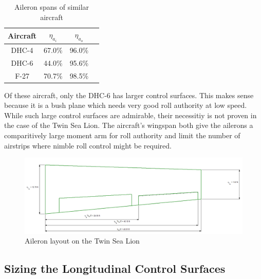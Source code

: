 \documentclass[conf]{new-aiaa}
\begin{document}
\begin{table}[H]
\centering
\caption{Aileron spans of similar aircraft}
\begin{tabular}{|c|c|c|c|}\hline
    Aircraft & $\eta_{a_i}$ & $\eta_{a_o}$ \\ \hline
    DHC-4 & 67.0\%          & 96.0\%        \\ \hline
    DHC-6 & 44.0\%          & 95.6\%        \\ \hline
    F-27  & 70.7\%          & 98.5\%        \\ \hline
\end{tabular}
\label{tab:similar_ailerons}
\end{table}

Of these aircraft, only the DHC-6 has larger control surfaces. This makes sense because it is a bush plane which needs very good roll authority at low speed. While such large control surfaces are admirable, their necessitiy is not proven in the case of the Twin Sea Lion. The aircraft's wingspan both give the ailerons a comparitively large moment arm for roll authority and limit the number of airstrips where nimble roll control might be required.


\begin{figure}[H]
    \includegraphics[width=\textwidth]{Report3Printouts/Wing_and_Aileron/aileron_sizing_plot.png}
    \caption{Aileron layout on the Twin Sea Lion}
    \label{fig:aileron_sizing_plot}
\end{figure}

\subsection{Sizing the Longitudinal Control Surfaces}
\end{document}
